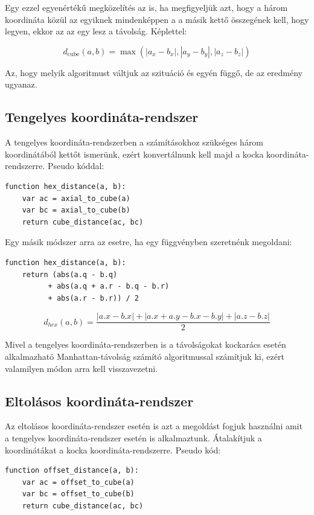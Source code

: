 \noindent Egy ezzel egyenértékű megközelítés az is, ha megfigyeljük azt, hogy a három koordináta közül az egyiknek mindenképpen a a másik kettő összegének kell, hogy legyen, ekkor az az egy lesz a távolság. 
\newline
\newline Képlettel:

$$
d_{\text{cube}}(a, b) =
\max(
|a_x - b_x|, |a_y - b_y|, |a_z - b_z|
)
$$

\noindent Az, hogy melyik algoritmust váltjuk az szituáció és egyén függő, de az eredmény ugyanaz.

\subsection{Tengelyes koordináta-rendszer}

A tengelyes koordináta-rendszerben a számításokhoz szükséges három koordinátából kettőt ismerünk, ezért konvertálnunk kell majd a kocka koordináta-rendszerre.
\newline
\newline Pseudo kóddal:
\begin{verbatim}
function hex_distance(a, b):
    var ac = axial_to_cube(a)
    var bc = axial_to_cube(b)
    return cube_distance(ac, bc)
\end{verbatim}    

\noindent Egy másik módszer arra az esetre, ha egy függvényben szeretnénk megoldani:
\begin{verbatim} 
function hex_distance(a, b):
    return (abs(a.q - b.q) 
          + abs(a.q + a.r - b.q - b.r)
          + abs(a.r - b.r)) / 2
\end{verbatim}    

$$
d_{hex}(a, b) = \frac{|a.x - b.x| + |a.x + a.y - b.x - b.y| + |a.z - b.z|}{2}
$$

\noindent Mivel a tengelyes koordináta-rendszerben is a távolságokat kockarács esetén alkalmazható Manhattan-távolság számító algoritmussal számítjuk ki, ezért valamilyen módon arra kell visszavezetni.

\subsection{Eltolásos koordináta-rendszer}

Az eltolásos koordináta-rendszer esetén is azt a megoldást fogjuk használni amit a tengelyes koordináta-rendszer esetén is alkalmaztunk. Átalakítjuk a koordinátákat a kocka koordináta-rendszerre.
\newline
\newline Pseudo kód:
\begin{verbatim} 
function offset_distance(a, b):
    var ac = offset_to_cube(a)
    var bc = offset_to_cube(b)
    return cube_distance(ac, bc)
\end{verbatim}  

